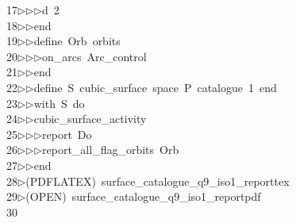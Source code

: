 \begin{tabbing}
17\>$\triangleright$\>$\triangleright$\>$\triangleright$\>d\ 2\ \\[0pt]
18\>$\triangleright$\>$\triangleright$\>end\ \\[0pt]
19\>$\triangleright$\>$\triangleright$\>define\ Orb\ orbits\ \\[0pt]
20\>$\triangleright$\>$\triangleright$\>$\triangleright$\>on\_arcs\ Arc\_control\ \\[0pt]
21\>$\triangleright$\>$\triangleright$\>end\ \\[0pt]
22\>$\triangleright$\>$\triangleright$\>define\ S\ cubic\_surface\ space\ P\ catalogue\ 1\ end\ \\[0pt]
23\>$\triangleright$\>$\triangleright$\>with\ S\ do\ \\[0pt]
24\>$\triangleright$\>$\triangleright$\>cubic\_surface\_activity\ \\[0pt]
25\>$\triangleright$\>$\triangleright$\>$\triangleright$\>report\ Do\ \\[0pt]
26\>$\triangleright$\>$\triangleright$\>$\triangleright$\>report\_all\_flag\_orbits\ Orb\ \\[0pt]
27\>$\triangleright$\>$\triangleright$\>end\\[0pt]
28\>$\triangleright$\>(PDFLATEX)\ surface\_catalogue\_q9\_iso1\_reporttex\\[0pt]
29\>$\triangleright$\>(OPEN)\ surface\_catalogue\_q9\_iso1\_reportpdf\\[0pt]
30\>\end{tabbing}
